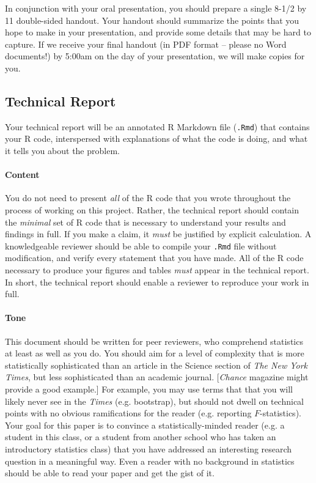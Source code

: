 \documentclass[10pt]{article}
\begin{document}
In conjunction with your oral presentation, you should prepare a single 8-1/2 by 11 double-sided handout. Your handout should summarize the points that you hope to make in your presentation, and provide some details that may be hard to capture. If we receive your final handout (in PDF format -- please no Word documents!) by 5:00am on the day of your presentation, we will make copies for you. 

\subsection{Technical Report}

Your technical report will be an annotated R Markdown file (\texttt{.Rmd}) that contains your R code, interspersed with explanations of what the code is doing, and what it tells you about the problem.  
	
\paragraph{Content}
You do not need to present \emph{all} of the R code that you wrote throughout the process of working on this project. Rather, the technical report should contain the \emph{minimal} set of R code that is necessary to understand your results and findings in full. If you make a claim, it \emph{must} be justified by explicit calculation. A knowledgeable reviewer should be able to compile your \texttt{.Rmd} file without modification, and verify every statement that you have made. All of the R code necessary to produce your figures and tables \emph{must} appear in the technical report. In short, the technical report should enable a reviewer to reproduce your work in full.
	
\paragraph{Tone} This document should be written for peer reviewers, who comprehend statistics at least as well as you do. You should aim for a level of complexity that is more statistically sophisticated than an article in the Science section of \textit{The New York Times}, but less sophisticated than an academic journal. [\textit{Chance} magazine might provide a good example.] For example, you may use terms that that you will likely never see in the \textit{Times} (e.g. bootstrap), but should not dwell on technical points with no obvious ramifications for the reader (e.g. reporting $F$-statistics). Your goal for this paper is to convince a statistically-minded reader (e.g. a student in this class, or a student from another school who has taken an introductory statistics class) that you have addressed an interesting research question in a meaningful way. Even a reader with no background in statistics should be able to read your paper and get the gist of it.  
\end{document}
